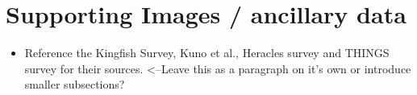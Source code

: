 
\section{Supporting Images / ancillary data}

\begin{itemize}
  \item Reference the Kingfish Survey, Kuno et al., Heracles survey and THINGS survey for their sources.  <--Leave this as a paragraph on it's own or introduce smaller subsections?
  
\end{itemize}

